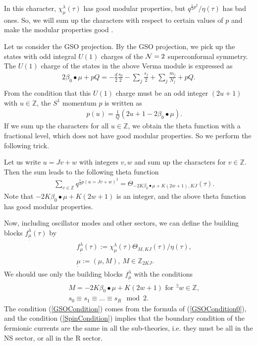 \documentclass[a4paper,12pt]{article}
\numberwithin{equation}{section}
\newcommand{\Ncal}{{\cal N}}
\newcommand{\Th}{\Theta}
\newcommand{\Zb}{{\mathbb Z}}
\newcommand{\mt}{\underset{\widetilde{}}{\mu}}
\begin{document}
In this character, $\chi^{\lambda}_{\mu}(\tau)$ has good modular
properties, but $q^{\frac12 p^2}/\eta(\tau)$ has bad ones.
So, we will sum up the characters with respect to
 certain values of $p$ and
make the
modular properties good \cite{Miz0003}\cite{ES0002}.

Let us consider the GSO projection. 
By the GSO projection, 
we pick up the states with odd integral $U(1)$ charges of the $\Ncal=2$
superconformal symmetry.
The $U(1)$ charge of the states in the above Verma module is expressed as
\begin{eqnarray*}
 2\beta_0\bullet\mu+pQ=-\frac d2 \frac{s_0}{2}-\sum_j \frac{s_j}{2}
+\sum_j\frac{m_j}{N_j}+pQ. \\
\end{eqnarray*}
From the condition that this $U(1)$ charge must be an odd integer
 $(2u+1)$ with $u\in \Zb$,
the $S^1$ momentum $p$ is written as
\begin{eqnarray*}
 && p(u)=\frac 1Q\left(2u+1-2\beta_0\bullet\mu \right).
\end{eqnarray*}
If we sum up the characters for all $u\in \Zb$, we obtain the theta
function with a fractional level\cite{ES0002}, 
which does not have good modular properties.
So we perform the following trick.

Let us write $u=Jv+w$ with integers $v,w$ and sum up the characters
for $v\in \Zb$. Then the sum leads to the following theta function
\begin{eqnarray}
 && \sum_{v\in \Zb}
 q^{\frac12 p(u=Jv+w)^2}=\Th_{-2K\beta_0\bullet\mu+K(2w+1),KJ}(\tau).
\label{GSOCondition0}
\end{eqnarray}
Note that $-2K\beta_0\bullet\mu+K(2w+1)$ is an integer, and the above
theta function has good modular properties.

Now, including oscillator modes and other sectors, 
we can define the building blocks
$f^{\lambda}_{\mt}(\tau)$ by
\begin{eqnarray*}
 &&f^{\lambda}_{\mt}(\tau):=\chi^{\lambda}_{\mu}(\tau)
\Th_{M,KJ}(\tau)/\eta(\tau),\\
 && \mt:=(\mu,M), \ M\in \Zb_{2KJ}.
\end{eqnarray*}
We should use only the building
blocks $f^{\lambda}_{\mt}$ with the conditions
\begin{eqnarray}
 && M=-2K\beta_0\bullet\mu+K(2w+1) \mbox{ for }{}^{\exists} w \in \Zb,
\label{GSOCondition}\\
 && s_0\equiv s_1 \equiv \dots \equiv s_R \mod 2 .
\label{SpinCondition}
\end{eqnarray}
The condition (\ref{GSOCondition}) comes 
from the formula of (\ref{GSOCondition0}), and
the condition (\ref{SpinCondition}) implies that 
the boundary condition of the fermionic currents are the same in
all the sub-theories, i.e. they must be all in the NS sector, 
or all in the R sector.
\end{document}
